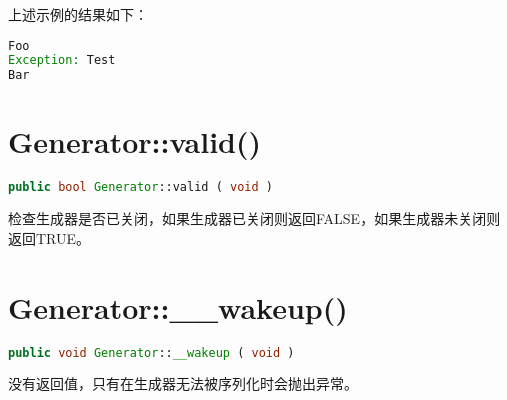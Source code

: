 上述示例的结果如下：

\begin{lstlisting}[language=PHP]
Foo
Exception: Test
Bar
\end{lstlisting}

\section{Generator::valid()}




\begin{lstlisting}[language=PHP]
public bool Generator::valid ( void )
\end{lstlisting}

检查生成器是否已关闭，如果生成器已关闭则返回FALSE，如果生成器未关闭则返回TRUE。


\section{Generator::\_\_wakeup()}




\begin{lstlisting}[language=PHP]
public void Generator::__wakeup ( void )
\end{lstlisting}

没有返回值，只有在生成器无法被序列化时会抛出异常。

\begin{lstlisting}[language=PHP]

\end{lstlisting}



\begin{lstlisting}[language=PHP]

\end{lstlisting}


\begin{lstlisting}[language=PHP]

\end{lstlisting}






\begin{lstlisting}[language=PHP]

\end{lstlisting}


\begin{lstlisting}[language=PHP]

\end{lstlisting}

























